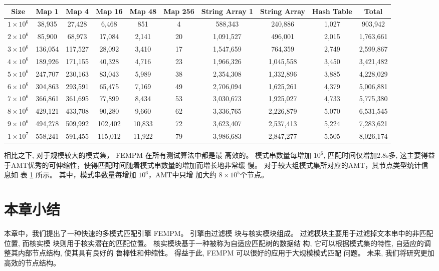 \begin{table}[!htp]
  \centering
  \footnotesize
  \label{tab:large_group}
  \begin{tabular}{cccccccccc}
 \hline
 Size &
 Map 1 &
 Map 4 &
 Map 16 &
 Map 48 &
 Map 256 &
 String Array 1&
 String Array   &
 Hash Table &
 Total\\
\hline
$1 \times 10^6$ &  38,935 &   27,428  &   6,468 &     851   &    4 &    588,343  &    240,886 &  1,027 &    903,942  \\
$2 \times 10^6$ &  85,900 &   68,973  &  17,084 &   2,141   &   20 &  1,091,527  &    496,001 &  2,015 &  1,763,661  \\
$3 \times 10^6$ & 136,054 &  117,527  &  28,092 &   3,410   &   17 &  1,547,659  &    764,359 &  2,749 &  2,599,867  \\
$4 \times 10^6$ & 189,926 &  171,155  &  40,328 &   4,716   &   23 &  1,966,326  &  1,045,558 &  3,450 &  3,421,482  \\
$5 \times 10^6$ & 247,707 &  230,163  &  83,043 &   5,989   &  38 &  2,354,308   &  1,332,896 &  3,885 &  4,228,029  \\
$6 \times 10^6$ & 304,863 &  293,591  &  65,475 &   7,169   &   49 &  2,706,094  &  1,625,261 &  4,379 &  5,006,881  \\
$7 \times 10^6$ & 366,861 &  361,695  &  77,899 &   8,434   &   53 &  3,030,673  &  1,925,027 &  4,733 &  5,775,380  \\
$8 \times 10^6$ & 429,121 &  433,708  &  90,280 &   9,660   &   62 &  3,336,765  &  2,226,879 &  5,070 &  6,531,545  \\
$9 \times 10^6$ & 494,278 &  509,992  & 102,402 &  10,833   &   72 &  3,623,407  &  2,537,413 &  5,224 &  7,283,621  \\
$1 \times 10^7$ & 558,241 &  591,455  & 115,012 &  11,922   &   79 &  3,986,683  &  2,847,277 &  5,505 &  8,026,174  \\
\hline
\end{tabular}
\end{table}

相比之下, 对于规模较大的模式集， \textsf{FEMPM} 在所有测试算法中都是最
高效的。 模式串数量每增加 $10^6$, 匹配时间仅增加2.8s多, 这主要得益
于AMT优秀的可伸缩性，使得匹配时间随着模式串数量的增加而增长地非常缓
慢。 对于较大组模式集所对应的AMT，其节点类型统计信息如
表 \ref{tab:large_group} 所示。 其中，模式串数量每增加 $10^6$，AMT中只增
加大约 $8 \times 10^5$个节点。

\section{本章小结}
\label{sec:conclusion}

本章中，我们提出了一种快速的多模式匹配引擎 \textsf{FEMPM}。 引擎由过滤模
块与核实模块组成。 过滤模块主要用于过滤掉文本串中的非匹配位置, 而核实模
块则用于核实潜在的匹配位置。 核实模块基于一种被称为自适应匹配树的数据结
构, 它可以根据模式集的特性, 自适应的调整其内部节点结构, 使其具有良好的
鲁棒性和伸缩性。 得益于此, \textsf{FEMPM} 可以很好的应用于大规模模式匹配
问题。 未来, 我们将研究更加高效的节点结构。
